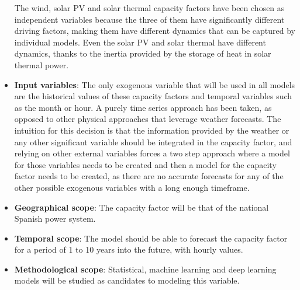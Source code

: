 \begin{itemize}
    The wind, solar PV and solar thermal capacity factors have been chosen as independent variables because the three of them have significantly different driving factors, making them have different dynamics that can be captured by individual models. Even the solar PV and solar thermal have different dynamics, thanks to the inertia provided by the storage of heat in solar thermal power. 
    \item \textbf{Input variables}: The only exogenous variable that will be used in all models are the historical values of these capacity factors and temporal variables such as the month or hour. A purely time series approach has been taken, as opposed to other physical approaches that leverage weather forecasts. The intuition for this decision is that the information provided by the weather or any other significant variable should be integrated in the capacity factor, and relying on other external variables forces a two step approach where a model for those variables needs to be created and then a model for the capacity factor needs to be created, as there are no accurate forecasts for any of the other possible exogenous variables with a long enough timeframe. 
    \item \textbf{Geographical scope}: The capacity factor will be that of the national Spanish power system. 
    \item \textbf{Temporal scope}: The model should be able to forecast the capacity factor for a period of 1 to 10 years into the future, with hourly values. 
    \item \textbf{Methodological scope}: Statistical, machine learning and deep learning models will be studied as candidates to modeling this variable. 
\end{itemize}

